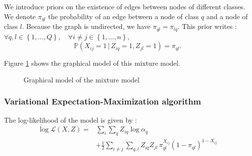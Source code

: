 \documentclass[switch, 12pt]{article}
\begin{document}
\begin{multicols}{2}
    We introduce priors on the existence of edges between nodes of different classes. We denote $\pi_{ql}$ the probability of an edge between a node of class $q$ and a node of class $l$. Because the graph is undirected, we have $\pi_{ql}=\pi_{lq}$. This prior writes : $ \forall q,l\in \left\{1,\dots,Q\right\}, \quad \forall i\neq j\in \left\{1,\dots,n\right\},$
    \begin{equation}
        \label{eq:conditional_distribution}
        \mathbb{P}(X_{ij}=1\,|\,Z_{iq}=1,Z_{jl}=1)=\pi_{ql}.
    \end{equation}

    Figure \ref{fig:graphical_model} shows the graphical model of this mixture model.

    \begin{figure}[H]
        \centering
        \caption{Graphical model of the mixture model}
        \label{fig:graphical_model}
    \end{figure}


    \subsubsection{Variational Expectation-Maximization algorithm}

    The log-likelihood of the model is given by :
    \begin{equation}
        \begin{aligned}
            \log \mathcal{L}(X, Z) = & \sum_{i}\sum_{q} Z_{iq}\log\alpha_q                                                            \\
                                     & + \frac{1}{2}\sum_{i\neq j}\sum_{q,l} Z_{iq}Z_{jl} \, \pi_{ql}^{X_{ij}}(1-\pi_{ql})^{1-X_{ij}}
        \end{aligned}
    \end{equation}


\end{multicols}
\end{document}
